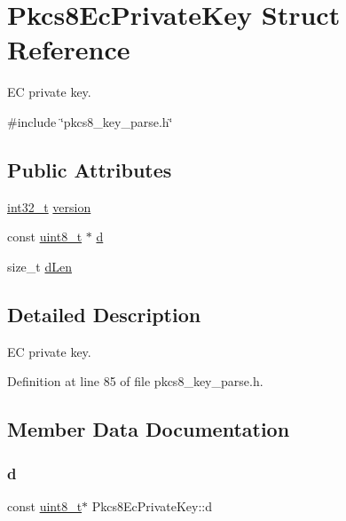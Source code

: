 \hypertarget{structPkcs8EcPrivateKey}{}\section{Pkcs8\+Ec\+Private\+Key Struct Reference}
\label{structPkcs8EcPrivateKey}


EC private key.  




{\ttfamily \#include \char`\"{}pkcs8\+\_\+key\+\_\+parse.\+h\char`\"{}}

\subsection*{Public Attributes}
\begin{DoxyCompactItemize}
\item 
\hyperlink{stdint_8h_ab1967d8591af1a4e48c37fd2b0f184d0}{int32\+\_\+t} \hyperlink{structPkcs8EcPrivateKey_a4cd85ed9dc55493823c0066128624265}{version}
\item 
const \hyperlink{stdint_8h_aba7bc1797add20fe3efdf37ced1182c5}{uint8\+\_\+t} $\ast$ \hyperlink{structPkcs8EcPrivateKey_a35153cab59bde53762b3063c882e5cd4}{d}
\item 
size\+\_\+t \hyperlink{structPkcs8EcPrivateKey_abd745dc89a69991f28d34ced7905bd2a}{d\+Len}
\end{DoxyCompactItemize}


\subsection{Detailed Description}
EC private key. 

Definition at line 85 of file pkcs8\+\_\+key\+\_\+parse.\+h.



\subsection{Member Data Documentation}
\mbox{\label{structPkcs8EcPrivateKey_a35153cab59bde53762b3063c882e5cd4}} 
\subsubsection{\texorpdfstring{d}{d}}
{\footnotesize\ttfamily const \hyperlink{stdint_8h_aba7bc1797add20fe3efdf37ced1182c5}{uint8\+\_\+t}$\ast$ Pkcs8\+Ec\+Private\+Key\+::d}



